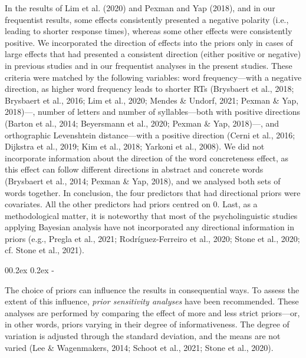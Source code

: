 \documentclass[
  12pt,
  man,floatsintext]{apa7}
\makeatletter
\let\oldsubparagraph\subparagraph
\renewcommand{\subparagraph}[1]{\oldsubparagraph{#1}\mbox{}}
\renewcommand{\subparagraph}[1]{\@startsection{subparagraph}{5}{1em}%
  {0\baselineskip \@plus 0.2ex \@minus 0.2ex}%
  {-\z@\relax}%
  {\normalfont\normalsize\itshape\hspace{\parindent}{#1}\textit{\addperi}}{\relax}}
\makeatother
\begin{document}
In the results of Lim et al. (2020) and Pexman and Yap (2018), and in our frequentist results, some effects consistently presented a negative polarity (i.e., leading to shorter response times), whereas some other effects were consistently positive. We incorporated the direction of effects into the priors only in cases of large effects that had presented a consistent direction (either positive or negative) in previous studies and in our frequentist analyses in the present studies. These criteria were matched by the following variables: word frequency---with a negative direction, as higher word frequency leads to shorter RTs (Brysbaert et al., 2018; Brysbaert et al., 2016; Lim et al., 2020; Mendes \& Undorf, 2021; Pexman \& Yap, 2018)---, number of letters and number of syllables---both with positive directions (Barton et al., 2014; Beyersmann et al., 2020; Pexman \& Yap, 2018)---, and orthographic Levenshtein distance---with a positive direction (Cerni et al., 2016; Dijkstra et al., 2019; Kim et al., 2018; Yarkoni et al., 2008). We did not incorporate information about the direction of the word concreteness effect, as this effect can follow different directions in abstract and concrete words (Brysbaert et al., 2014; Pexman \& Yap, 2018), and we analysed both sets of words together. In conclusion, the four predictors that had directional priors were covariates. All the other predictors had priors centred on 0. Last, as a methodological matter, it is noteworthy that most of the psycholinguistic studies applying Bayesian analysis have not incorporated any directional information in priors (e.g., Pregla et al., 2021; Rodríguez-Ferreiro et al., 2020; Stone et al., 2020; cf. Stone et al., 2021).

\hypertarget{prior-distributions-and-prior-predictive-checks}{%
\subparagraph{Prior distributions and prior predictive checks}\label{prior-distributions-and-prior-predictive-checks}}

The choice of priors can influence the results in consequential ways. To assess the extent of this influence, \emph{prior sensitivity analyses} have been recommended. These analyses are performed by comparing the effect of more and less strict priors---or, in other words, priors varying in their degree of informativeness. The degree of variation is adjusted through the standard deviation, and the means are not varied (Lee \& Wagenmakers, 2014; Schoot et al., 2021; Stone et al., 2020).
\end{document}
